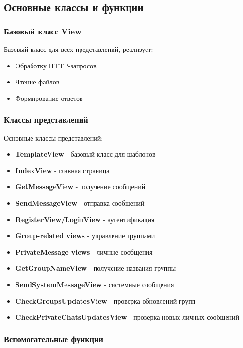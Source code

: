 \subsection{Основные классы и функции}

\subsubsection{Базовый класс View}

Базовый класс для всех представлений, реализует:
\begin{itemize}
	\item Обработку HTTP-запросов
	\item Чтение файлов
	\item Формирование ответов
\end{itemize}

\subsubsection{Классы представлений}

Основные классы представлений:
\begin{itemize}
	\item \textbf{TemplateView} - базовый класс для шаблонов
	\item \textbf{IndexView} - главная страница
	\item \textbf{GetMessageView} - получение сообщений
	\item \textbf{SendMessageView} - отправка сообщений
	\item \textbf{RegisterView/LoginView} - аутентификация
	\item \textbf{Group-related views} - управление группами
	\item \textbf{PrivateMessage views} - личные сообщения
	\item \textbf{GetGroupNameView} - получение названия группы
	\item \textbf{SendSystemMessageView} - системные сообщения
	\item \textbf{CheckGroupsUpdatesView} - проверка обновлений групп
	\item \textbf{CheckPrivateChatsUpdatesView} - проверка новых личных сообщений
\end{itemize}

\subsubsection{Вспомогательные функции}

